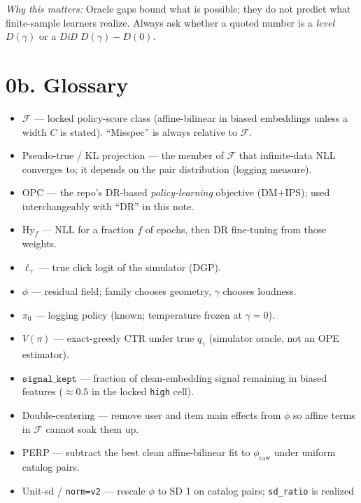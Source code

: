 \documentclass[11pt]{article}
\newcommand{\phonesection}[1]{\Needspace{8\baselineskip}\section*{#1}}
\newcommand{\why}[1]{\par{\footnotesize\color{blue!35!black}\textit{Why this matters:} #1\par}}
\begin{document}
\why{Oracle gaps bound what is possible;
they do not predict what finite-sample
learners realize.  Always ask whether a
quoted number is a \emph{level} $D(\gamma)$
or a \emph{DiD} $D(\gamma)-D(0)$.}

\phonesection{0b. Glossary}

\begin{itemize}
  \item $\mathcal{F}$ --- locked policy-score
        class (affine-bilinear in biased
        embeddings unless a width $C$ is
        stated).  ``Misspec'' is always
        relative to $\mathcal{F}$.
  \item Pseudo-true / KL projection ---
        the member of $\mathcal{F}$ that
        infinite-data NLL converges to; it
        depends on the pair distribution
        (logging measure).
  \item OPC --- the repo's DR-based
        \emph{policy-learning} objective
        (DM$+$IPS); used interchangeably
        with ``DR'' in this note.
  \item Hy$_f$ --- NLL for a fraction $f$
        of epochs, then DR fine-tuning
        from those weights.
  \item $\ell_{\gamma}$ --- true click logit
        of the simulator (DGP).
  \item $\phi$ --- residual field; family
        chooses geometry, $\gamma$ chooses
        loudness.
  \item $\pi_{0}$ --- logging policy
        (known; temperature frozen at
        $\gamma{=}0$).
  \item $V(\pi)$ --- exact-greedy CTR under
        true $q_{\gamma}$ (simulator oracle,
        not an OPE estimator).
  \item $\texttt{signal\_kept}$ --- fraction
        of clean-embedding signal remaining
        in biased features ($\approx 0.5$ in
        the locked \texttt{high} cell).
  \item Double-centering --- remove user
        and item main effects from $\phi$
        so affine terms in $\mathcal{F}$
        cannot soak them up.
  \item PERP --- subtract the best clean
        affine-bilinear fit to
        $\phi_{\mathrm{raw}}$ under uniform
        catalog pairs.
  \item Unit-sd / \texttt{norm=v2} ---
        rescale $\phi$ to SD 1 on catalog
        pairs; \texttt{sd\_ratio} is realized

\end{itemize}
\end{document}
